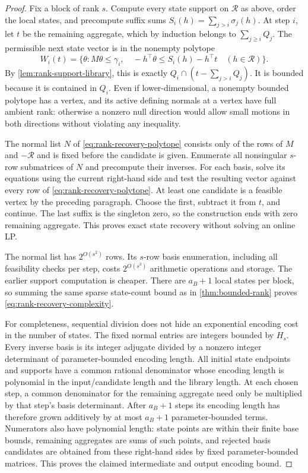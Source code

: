 \begin{proof}
Fix a block of rank $s$. Compute every state support on $\mathcal R$
as above, order the local states, and precompute suffix sums
$S_i(h)=\sum_{j>i}\sigma_j(h)$. At step $i$, let $t$ be the remaining
aggregate, which by induction belongs to $\sum_{j\ge i}Q_j$.
The permissible next state vector is in the nonempty polytope
\begin{equation}\label{eq:rank-recovery-polytope}
 W_i(t)=\{\theta:M\theta\le\gamma_i,\quad
                  -h^\top\theta\le S_i(h)-h^\top t
                                     \quad(h\in\mathcal R)\}.
\end{equation}
By \cref{lem:rank-support-library}, this is exactly
$Q_i\cap(t-\sum_{j>i}Q_j)$. It is bounded because it is contained
in $Q_i$. Even if lower-dimensional, a nonempty bounded polytope has
a vertex, and its active defining normals at a vertex have full ambient
rank: otherwise a nonzero null direction would allow small motions in
both directions without violating any inequality.

The normal list $N$ of \eqref{eq:rank-recovery-polytope} consists only
of the rows of $M$ and $-\mathcal R$ and is fixed before the candidate
is given. Enumerate all nonsingular $s$-row submatrices of $N$ and
precompute their inverses. For each basis, solve its equations using
the current right-hand side and test the resulting vector against every
row of \eqref{eq:rank-recovery-polytope}. At least one candidate is a
feasible vertex by the preceding paragraph. Choose the first, subtract
it from $t$, and continue. The last suffix is the singleton zero, so
the construction ends with zero remaining aggregate. This proves exact
state recovery without solving an online LP.

The normal list has $2^{O(s^2)}$ rows. Its $s$-row basis enumeration,
including all feasibility checks per step, costs $2^{O(s^3)}$ arithmetic
operations and storage. The earlier support computation is cheaper.
There are $a_B+1$ local states per block, so summing the same sparse
state-count bound as in \cref{thm:bounded-rank} proves
\eqref{eq:rank-recovery-complexity}.

For completeness, sequential division does not hide an exponential
encoding cost in the number of states. The fixed normal entries are
integers bounded by $H_s$. Every inverse basis is its integer adjugate
divided by a nonzero integer determinant of parameter-bounded encoding
length. All initial state endpoints and supports have a common rational
denominator whose encoding length is polynomial in the input/candidate
length and the library length. At each chosen step, a common denominator
for the remaining aggregate need only be multiplied by that step's
basis determinant. After $a_B+1$ steps its encoding length has therefore
grown additively by at most $a_B+1$ parameter-bounded terms. Numerators
also have polynomial length: state points are within their finite base
bounds, remaining aggregates are sums of such points, and rejected
basis candidates are obtained from these right-hand sides by fixed
parameter-bounded matrices. This proves the claimed intermediate and
output encoding bound.


\end{proof}
